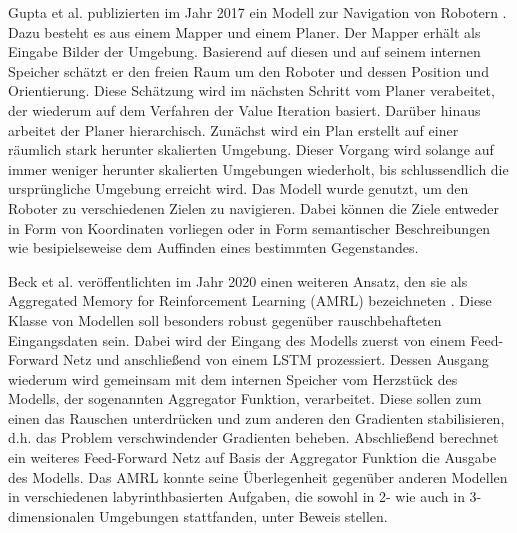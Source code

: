 Gupta et al. publizierten im Jahr 2017 ein Modell zur Navigation von Robotern \cite{MappingPlanning}. Dazu besteht es aus einem Mapper und einem Planer. Der Mapper erhält als Eingabe Bilder der Umgebung. Basierend auf diesen und auf seinem internen Speicher schätzt er den freien Raum um den Roboter und dessen Position und Orientierung. Diese Schätzung wird im nächsten Schritt vom Planer verabeitet, der wiederum auf dem Verfahren der Value Iteration basiert. Darüber hinaus arbeitet der Planer hierarchisch. Zunächst wird ein Plan erstellt auf einer räumlich stark herunter skalierten Umgebung. Dieser Vorgang wird solange auf immer weniger herunter skalierten Umgebungen wiederholt, bis schlussendlich die ursprüngliche Umgebung erreicht wird. Das Modell wurde genutzt, um den Roboter zu verschiedenen Zielen zu navigieren. Dabei können die Ziele entweder in Form von Koordinaten vorliegen oder in Form semantischer Beschreibungen wie besipielseweise dem Auffinden eines bestimmten Gegenstandes.

Beck et al. veröffentlichten im Jahr 2020 einen weiteren Ansatz, den sie als Aggregated Memory for Reinforcement Learning (AMRL) bezeichneten \cite{AMRL}. Diese Klasse von Modellen soll besonders robust gegenüber rauschbehafteten Eingangsdaten sein. Dabei wird der Eingang des Modells zuerst von einem Feed-Forward Netz und anschließend von einem LSTM prozessiert. Dessen Ausgang wiederum wird gemeinsam mit dem internen Speicher vom Herzstück des Modells, der sogenannten Aggregator Funktion, verarbeitet. Diese sollen zum einen das Rauschen unterdrücken und zum anderen den Gradienten stabilisieren, d.h. das Problem verschwindender Gradienten beheben. Abschließend berechnet ein weiteres Feed-Forward Netz auf Basis der Aggregator Funktion die Ausgabe des Modells. Das AMRL konnte seine Überlegenheit gegenüber anderen Modellen in verschiedenen labyrinthbasierten Aufgaben, die sowohl in 2- wie auch in 3-dimensionalen Umgebungen stattfanden, unter Beweis stellen.

